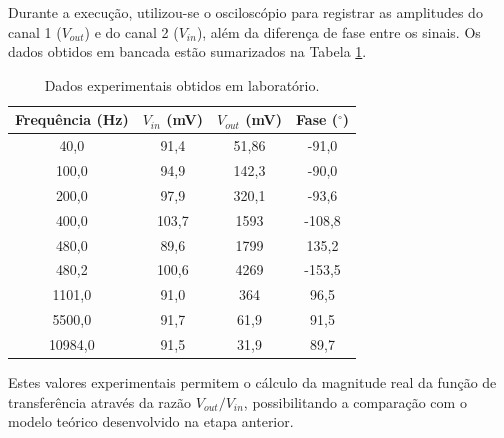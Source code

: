 Durante a execução, utilizou-se o osciloscópio para registrar as amplitudes do canal 1 ($V_{out}$) e do canal 2 ($V_{in}$), além da diferença de fase entre os sinais. Os dados obtidos em bancada estão sumarizados na Tabela \ref{tab:dados_experimentais}.

\begin{table}[H]
	\centering
	\caption{Dados experimentais obtidos em laboratório.}
	\label{tab:dados_experimentais}
	\begin{tabular}{c|c|c|c}
		\hline
		\textbf{Frequência (Hz)} & \textbf{$V_{in}$ (mV)} & \textbf{$V_{out}$ (mV)} & \textbf{Fase ($^\circ$)} \\ \hline
		40,0      & 91,4  & 51,86 & -91,0  \\ [3pt]
		100,0     & 94,9  & 142,3 & -90,0  \\ [3pt]
		200,0     & 97,9  & 320,1 & -93,6  \\ [3pt]
		400,0     & 103,7 & 1593  & -108,8 \\ [3pt]
		480,0     & 89,6  & 1799  & 135,2  \\ [3pt]
		480,2     & 100,6 & 4269  & -153,5 \\ [3pt]
		1101,0    & 91,0  & 364   & 96,5   \\ [3pt]
		5500,0    & 91,7  & 61,9  & 91,5   \\ [3pt]
		10984,0   & 91,5  & 31,9  & 89,7   \\ [3pt]
		\hline
	\end{tabular}
\end{table}

Estes valores experimentais permitem o cálculo da magnitude real da função de transferência através da razão $V_{out}/V_{in}$, possibilitando a comparação com o modelo teórico desenvolvido na etapa anterior.
